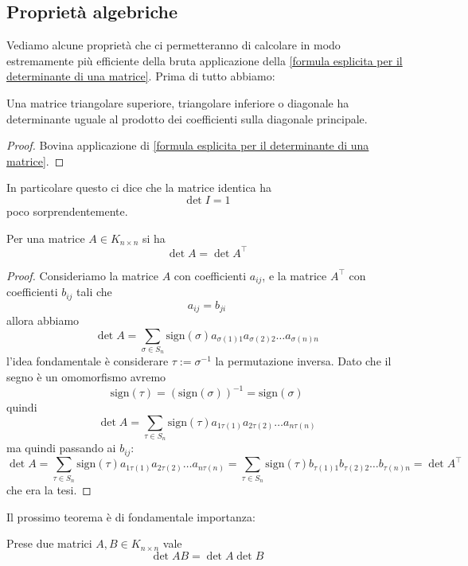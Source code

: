 \documentclass[11pt]{scrartcl}
\begin{document}
   	 \subsection{Proprietà algebriche}
   	 Vediamo alcune proprietà che ci permetteranno di calcolare in modo estremamente più efficiente della bruta applicazione della \ref{formula esplicita per il determinante di una matrice}. Prima di tutto abbiamo:
   	 \begin{corollary}
   	 	Una matrice triangolare superiore, triangolare inferiore o diagonale ha determinante uguale al prodotto dei coefficienti sulla diagonale principale.
   	 \end{corollary}
   	 \begin{proof}
   	 	Bovina applicazione di \ref{formula esplicita per il determinante di una matrice}.
   	 \end{proof}
   	 In particolare questo ci dice che la matrice identica ha 
   	 $$\det I=1$$
   	 poco sorprendentemente.
   	 \begin{lemma}\label{determinante della trasposta}
   	 	Per una matrice $A\in K_{n\times n}$ si ha
   	 	$$\det A= \det A^\intercal$$
   	 \end{lemma}
   	 \begin{proof}
   	 	Consideriamo la matrice $A$ con coefficienti $a_{ij}$, e la matrice $A^\intercal$ con coefficienti $b_{ij}$ tali che 
   	 	$$a_{ij}=b_{ji}$$
   	 	allora abbiamo
   	 	$$\det A = \sum_{\sigma\in S_n}\text{sign}(\sigma)a_{\sigma(1)1}a_{\sigma(2)2}\dots a_{\sigma(n)n}$$
   	 	l'idea fondamentale è considerare $\tau:=\sigma^{-1}$ la permutazione inversa. Dato che il segno è un omomorfismo avremo
   	 	$$\text{sign}(\tau)=\left(\text{sign}(\sigma)\right)^{-1}=\text{sign}(\sigma)$$
   	 	quindi
   	 	$$\det A = \sum_{\tau\in S_n}\text{sign}(\tau)a_{1\tau(1)}a_{2\tau(2)}\dots a_{n\tau(n)}$$
   	 	ma quindi passando ai $b_{ij}$:
   	 	$$\det A = \sum_{\tau\in S_n}\text{sign}(\tau)a_{1\tau(1)}a_{2\tau(2)}\dots a_{n\tau(n)} = \sum_{\tau\in S_n}\text{sign}(\tau)b_{\tau(1)1}b_{\tau(2)2}\dots b_{\tau(n)n}=\det A^\intercal$$
   	 	che era la tesi.
   	 \end{proof}
   	 Il prossimo teorema è di fondamentale importanza:
   	 \begin{theorem}[Binet]
   	 	Prese due matrici $A,B\in K_{n\times n}$ vale
   	 	$$\det AB=\det A \det B$$
   	 \end{theorem}
\end{document}

